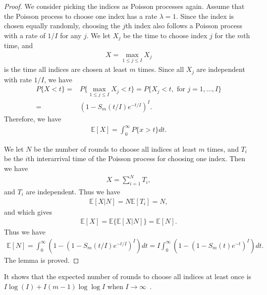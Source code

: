 \documentclass{article}
\begin{document}
\begin{proof}
We consider picking the indices as Poisson processes again. Assume that the Poisson process to choose one index has a rate $\lambda=1$. Since the index is chosen equally randomly, choosing the $j$th index also follows a Poisson process with a rate of $1/I$ for any $j$. 
We let $X_j$ be the time to choose index $j$ for the $m$th time, and 
\begin{align}
    X=\max_{1\leq j \leq I}X_j
\end{align}
is the time all indices are chosen at least $m$ times. 
Since all $X_j$ are independent with rate $1/I$, we have 
\begin{align*}
    P\{X<t\} =& P\{\max\limits_{1\leq j\leq I}X_j<t\} = P\{X_j <t, \mbox{ for } j=1,\dots,I\}\\
    =&(1-S_m(t/I)e^{-t/I})^I.
\end{align*}
Therefore, we have 
\begin{align*}
    \mathbb{E}[X] =\int_0^\infty P\{x>t\}dt.
\end{align*}

We let $N$ be the number of rounds to choose all indices at least $m$ times, and $T_i$ be the $i$th interarrival time of the Poisson process for choosing one index. Then we have 
\begin{align*}
    X=\sum_{i=1}^NT_i,
\end{align*}
and $T_i$ are independent. Thus we have 
\begin{align*}
    \mathbb{E}[X|N] = N\mathbb{E}[T_i] = N,
\end{align*}
and which gives 
\begin{align*}
    \mathbb{E}[X]=\mathbb{E}\{\mathbb{E}[X|N]\}=\mathbb{E}[N].
\end{align*}
Thus we have 
\begin{align*}
    \mathbb{E}[N]=\int_0^\infty \left(1- (1-S_m(t/I)e^{-t/I})^I\right)dt= I\int_0^\infty \left(1- (1-S_m(t)e^{-t})^I\right)dt.
\end{align*}
The lemma is proved. 
\end{proof}
It shows that the expected number of rounds to choose all indices at least once is $I\log (I)+I(m-1)\log\log I$ when $I\rightarrow\infty$~\citep{newman1960double}.
\end{document}
